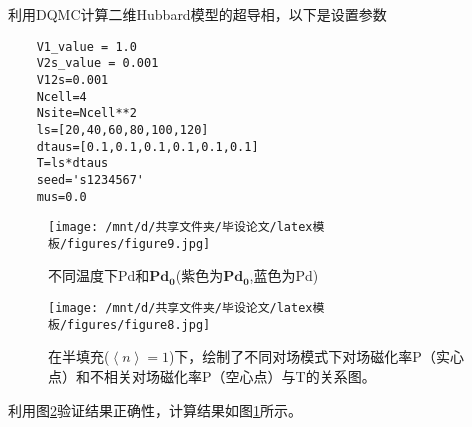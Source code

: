 利用DQMC计算二维Hubbard模型的超导相，以下是设置参数
\begin{lstlisting}
    V1_value = 1.0
    V2s_value = 0.001
    V12s=0.001
    Ncell=4
    Nsite=Ncell**2
    ls=[20,40,60,80,100,120]
    dtaus=[0.1,0.1,0.1,0.1,0.1,0.1]
    T=ls*dtaus
    seed='s1234567'
    mus=0.0
\end{lstlisting}
\begin{figure}[H]
    \texttt{[image: /mnt/d/共享文件夹/毕设论文/latex模板/figures/figure9.jpg]}
    \caption{不同温度下Pd和$\mathbf{Pd_0}$(紫色为$\mathbf{Pd_0}$,蓝色为Pd)}
    \label{fig9}
\end{figure}

\begin{figure}[H]
    \texttt{[image: /mnt/d/共享文件夹/毕设论文/latex模板/figures/figure8.jpg]}
    \caption{在半填充($\left \langle n \right \rangle=1$)下，绘制了不同对场模式下对场磁化率P（实心点）和不相关对场磁化率P（空心点）与T的关系图\cite{13}。}
    \label{fig8}
\end{figure}

利用图\ref{fig8}验证结果正确性，计算结果如图\ref{fig9}所示。


























